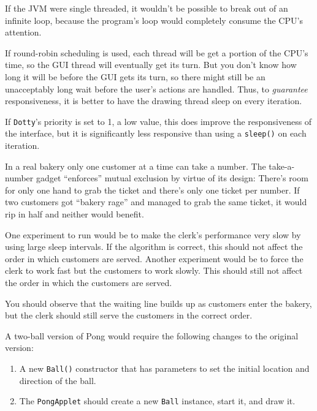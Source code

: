 \begin{ANS}
\item  If the JVM were single threaded, it wouldn't be possible to break out
of an infinite loop, because the program's loop would completely
consume the CPU's attention.


\item  If round-robin scheduling is used, each thread will be get a portion
of the CPU's time, so the GUI thread will eventually get its turn.
But you don't know how long it will be before the GUI gets its
turn, so there might still be an unacceptably long wait before the
user's actions are handled.   Thus, to {\it guarantee} responsiveness,
it is better to have the drawing thread sleep on every iteration.

\item  If {\tt Dotty}'s priority is set to 1, a low value, this
does improve the responsiveness of the interface, but it
is significantly less responsive than using a {\tt sleep()}
on each iteration.

\item  In a real bakery only one customer at a time can take a number.  The
take-a-number gadget ``enforces'' mutual exclusion by virtue of its
design: There's room for only one hand to grab the ticket and there's
only one ticket per number.  If two customers got ``bakery rage'' and
managed to grab the same ticket, it would rip in half and neither
would benefit.

\item  One experiment to run would be to make the clerk's performance very
slow by using large sleep intervals.   If the algorithm is correct,
this should not affect the order in which customers are
served.  Another experiment would be to force the clerk to work fast
but the customers to work slowly.  This should still not affect the order
in which the customers are served.

\item  You should observe that the waiting line builds up as
customers enter the bakery, but the clerk should
still serve the customers in the correct order.

\item A two-ball version of Pong would require the following
changes to the original version:
\begin{enumerate}
\item A new {\tt Ball()} constructor that has parameters to
set the initial location and direction of the ball.
\item The {\tt PongApplet} should create a new {\tt Ball}
instance, start it, and draw it.
\end{enumerate}

\end{ANS}


